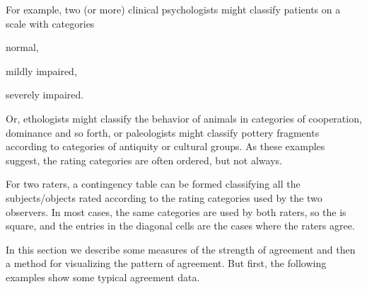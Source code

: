 \documentclass[11pt]{book}\usepackage[]{graphicx}\usepackage[]{color}
\begin{document}
For example, two (or more) clinical psychologists might classify
patients on a scale with categories
\begin{seriate}
\item normal, 
\item mildly impaired,
\item severely impaired.
\end{seriate}
Or, ethologists might classify the behavior
of animals in categories of cooperation, dominance and so forth,
or paleologists might classify pottery fragments according to
categories of antiquity or cultural groups. As these examples
suggest, the rating categories are often ordered, but not always.

For two raters, a
contingency table can be
formed classifying all the subjects/objects rated
according to the rating categories used by the two
observers. 
In most cases, the same categories are used by both raters,
so the \ctab is square, and the entries in the diagonal cells
are the cases where the raters agree.

In this section we describe some measures of the strength
of agreement and then a method for visualizing the pattern of
agreement.  But first, the following examples show some
typical agreement data.
\end{document}
